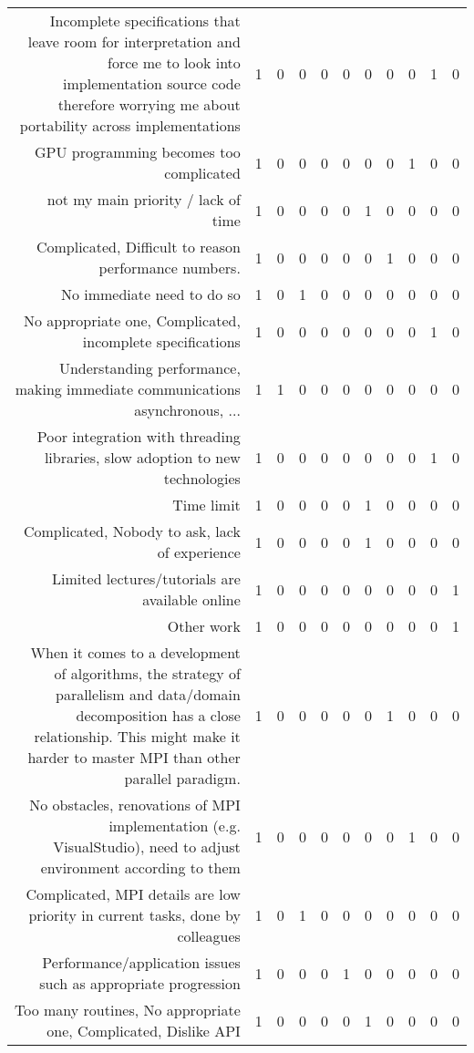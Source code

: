 {\begin{landscape}
\begin{longtable}[htb]{r|c|c|c|c|c|c|c|c|c|c}
{Incomplete specifications that leave room for interpretation and force me to look into implementation source code therefore worrying me about portability across implementations} & 1 & 0 & 0 & 0 & 0 & 0 & 0 & 0 & 1 & 0 \\%
{GPU programming becomes too complicated} & 1 & 0 & 0 & 0 & 0 & 0 & 0 & 1 & 0 & 0 \\%
{not my main priority / lack of time} & 1 & 0 & 0 & 0 & 0 & 1 & 0 & 0 & 0 & 0 \\%
{Complicated, Difficult to reason performance numbers.} & 1 & 0 & 0 & 0 & 0 & 0 & 1 & 0 & 0 & 0 \\%
{No immediate need to do so} & 1 & 0 & 1 & 0 & 0 & 0 & 0 & 0 & 0 & 0 \\%
{No appropriate one, Complicated, incomplete specifications} & 1 & 0 & 0 & 0 & 0 & 0 & 0 & 0 & 1 & 0 \\%
{Understanding performance, making immediate communications asynchronous, ...} & 1 & 1 & 0 & 0 & 0 & 0 & 0 & 0 & 0 & 0 \\%
{Poor integration with threading libraries, slow adoption to new technologies} & 1 & 0 & 0 & 0 & 0 & 0 & 0 & 0 & 1 & 0 \\%
{Time limit} & 1 & 0 & 0 & 0 & 0 & 1 & 0 & 0 & 0 & 0 \\%
{Complicated, Nobody to ask, lack of experience} & 1 & 0 & 0 & 0 & 0 & 1 & 0 & 0 & 0 & 0 \\%
{Limited lectures/tutorials are available online} & 1 & 0 & 0 & 0 & 0 & 0 & 0 & 0 & 0 & 1 \\%
{Other work} & 1 & 0 & 0 & 0 & 0 & 0 & 0 & 0 & 0 & 1 \\%
{When it comes to a development of algorithms, the strategy of parallelism and  data/domain decomposition has a close relationship. This might make it harder to master MPI than other parallel paradigm.} & 1 & 0 & 0 & 0 & 0 & 0 & 1 & 0 & 0 & 0 \\%
{No obstacles, renovations of MPI implementation (e.g. VisualStudio), need to adjust environment according to them} & 1 & 0 & 0 & 0 & 0 & 0 & 0 & 1 & 0 & 0 \\%
{Complicated, MPI details are low priority in current tasks, done by colleagues} & 1 & 0 & 1 & 0 & 0 & 0 & 0 & 0 & 0 & 0 \\%
{Performance/application issues such as appropriate progression} & 1 & 0 & 0 & 0 & 1 & 0 & 0 & 0 & 0 & 0 \\%
{Too many routines, No appropriate one, Complicated, Dislike API} & 1 & 0 & 0 & 0 & 0 & 1 & 0 & 0 & 0 & 0 \\%

\end{longtable}
\end{landscape}}
